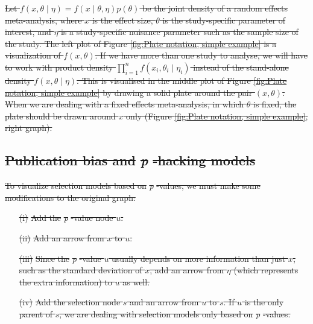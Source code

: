 \documentclass[useAMS,usenatbib,referee]{biom}
\providecommand{\DIFdeltex}[1]{{\protect\color{red}\sout{#1}}}                      %
\providecommand{\DIFdel}[1]{\texorpdfstring{\DIFdeltex{#1}}{}} %
\begin{document}
\DIFdel{Let $f(x,\theta\mid\eta)=f(x\mid\theta,\eta)p(\theta)$
be the joint density of a random effects meta-analysis, where $x$ is the effect size, $\theta$ is the study-specific parameter of interest, and $\eta$ is a study-specific nuisance parameter such as the sample size of the study. The left plot of Figure \ref{fig:Plate notation, simple example} is a visualization of $f(x,\theta)$. If we have more than one study to analyse, we will have to work with product density $\prod_{i=1}^{n}f(x_{i},\theta_{i}\mid\eta_{i})$ instead of the stand-alone density $f(x,\theta\mid\eta)$. This is visualised in the middle plot of Figure \ref{fig:Plate notation, simple example}  by drawing a solid plate around the pair $(x,\theta)$. When we are dealing with a fixed effects meta-analysis, in which $\theta$ is fixed, the plate should be drawn around $x$ only (Figure \ref{fig:Plate notation, simple example}, right graph). 
}%

\subsection{\DIFdel{Publication bias and }\textit{\DIFdel{p}}%
\DIFdel{-hacking models}%
}
\addtocounter{subsection}{-1}%

\DIFdel{To visualize selection models based on }\textit{\DIFdel{p}}%
\DIFdel{-values, we must make some modifications to the original graph: }%

\begin{enumerate}%
\item[\DIFdel{(i)}]%
\DIFdel{Add the }\textit{\DIFdel{p}}%
\DIFdel{-value node $u$.
}%
\item[\DIFdel{(ii)}]%
\DIFdel{Add an arrow from $x$ to $u$. 
}%
\item[\DIFdel{(iii)}]%
\DIFdel{Since the }\textit{\DIFdel{p}}%
\DIFdel{-value $u$ usually depends on more information than just $x$, such as the standard deviation of $x$, add an arrow from $\eta$ (which represents the extra information) to $u$ as well.
}%
\item[\DIFdel{(iv)}]%
\DIFdel{Add the selection node $s$ and an arrow from $u$ to $s$. If $u$ is the only parent of $s$, we are dealing with selection models only based on
}\textit{\DIFdel{p}}%
\DIFdel{-values. }
\end{enumerate}%
\end{document}

